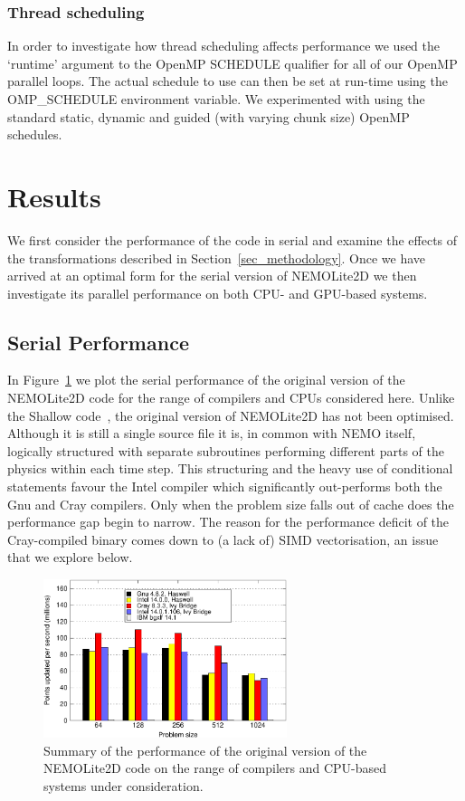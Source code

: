 \documentclass[journal]{IEEEtran}
\begin{document}
\subsubsection{Thread scheduling}
\label{sec_scheduling}

In order to investigate how thread scheduling affects performance we
used the `runtime' argument to the OpenMP SCHEDULE qualifier for all
of our OpenMP parallel loops. The actual schedule to use can then be
set at run-time using the OMP\_SCHEDULE environment variable. We
experimented with using the standard static, dynamic and guided (with
varying chunk size) OpenMP schedules.

\section{Results}

We first consider the performance of the code in serial and examine
the effects of the transformations described in
Section~\ref{sec_methodology}. Once we have arrived at an optimal form
for the serial version of NEMOLite2D we then investigate its parallel
performance on both CPU- and GPU-based systems.

\subsection{Serial Performance}

In Figure~\ref{FIG_orig_perf_summary} we plot the serial performance
of the original version of the NEMOLite2D code for the range of
compilers and CPUs considered here. Unlike the Shallow
code~\cite{shallow_psykal}, the original version of NEMOLite2D has not
been optimised. Although it is still a single source file it is, in
common with NEMO itself, logically structured with separate
subroutines performing different parts of the physics within each time
step. This structuring and the heavy use of conditional statements
favour the Intel compiler which significantly out-performs both the
Gnu and Cray compilers. Only when the problem size falls out of cache
does the performance gap begin to narrow. The reason for the
performance deficit of the Cray-compiled binary comes down to (a lack
of) SIMD vectorisation, an issue that we explore below.

\begin{figure}[!t]
\centering
\includegraphics[width=2.8in]{orig_summary}
\caption{Summary of the performance of the original version of the 
NEMOLite2D code on 
the range of compilers and CPU-based systems under consideration.}
\label{FIG_orig_perf_summary}
\end{figure}
\end{document}
